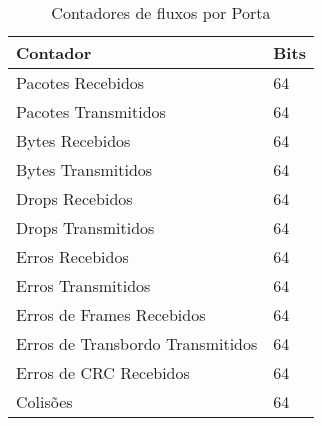 
\begin{table}[h!]
    \centering
    \begin{tabular}{| l | l |}
    \hline
    \textbf{Contador} & \textbf{Bits} \\ \hline
    Pacotes Recebidos & 64 \\ \hline
    Pacotes Transmitidos & 64 \\ \hline
    Bytes Recebidos & 64 \\ \hline
    Bytes Transmitidos & 64 \\ \hline
    Drops Recebidos & 64 \\ \hline
    Drops Transmitidos & 64 \\ \hline
    Erros Recebidos & 64 \\ \hline
    Erros Transmitidos & 64 \\ \hline
    Erros de Frames Recebidos & 64 \\ \hline
    Erros de Transbordo Transmitidos & 64 \\ \hline
    Erros de CRC Recebidos & 64 \\ \hline
    Colisões & 64 \\
    \hline
    \end{tabular}
    \caption{Contadores de fluxos por Porta}
    \label{tbl:counters}
\end{table}
